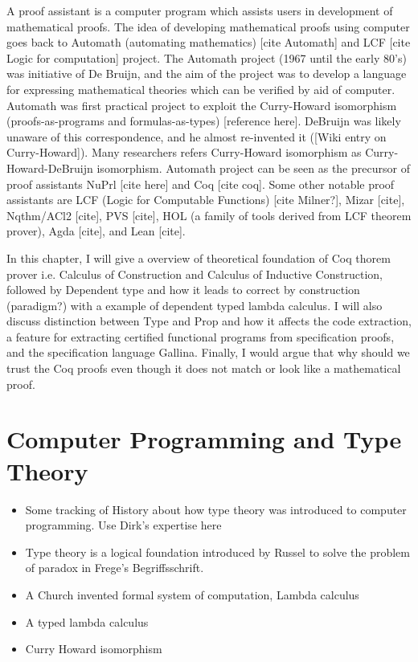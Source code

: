 
A proof assistant is a computer program which assists users in development of mathematical proofs. The idea of 
developing mathematical proofs using computer goes back to Automath (automating mathematics)
[cite Automath] and LCF [cite Logic for computation] project. The 
Automath project (1967 until the early 80's)  was initiative of De Bruijn, and the aim of the project was to develop
a language for expressing mathematical theories which can be verified by aid of computer.  Automath was first 
practical project to exploit the Curry-Howard isomorphism (proofs-as-programs and formulas-as-types)
 [reference here]. DeBruijn  was likely unaware of this correspondence, and he almost re-invented it 
 ([Wiki entry on Curry-Howard]). Many researchers refers Curry-Howard isomorphism as 
 Curry-Howard-DeBruijn isomorphism. Automath project can be seen as the precursor of
 proof assistants NuPrl [cite here] and Coq [cite coq].   Some other notable  proof assistants are 
 LCF (Logic for Computable Functions)  [cite Milner?], Mizar [cite], Nqthm/ACl2 [cite], PVS [cite], 
 HOL (a family of tools derived from LCF theorem prover), Agda [cite], and Lean [cite].


In this chapter, I will give a overview of theoretical foundation of 
Coq thorem prover i.e. Calculus of Construction and  
Calculus of Inductive Construction, followed by Dependent type 
and how it leads to 
correct by construction (paradigm?) with a example of dependent 
typed lambda calculus. I will also discuss distinction between Type and Prop 
and how it affects the code extraction, a feature for extracting 
certified functional programs from specification proofs, and the 
specification language Gallina. Finally, I would 
argue that why should we trust the Coq proofs even though it does not 
match or look like a mathematical proof.



 
\section{Computer Programming and Type Theory}
	\begin{itemize}
	\item Some tracking of History about how type theory was introduced 
	     to computer programming. Use Dirk's expertise here
	\item Type theory is a logical foundation introduced by 
	      Russel to solve the problem of  paradox in Frege's 
	      Begriffsschrift.
	\item A Church invented formal system of computation, Lambda calculus
	\item A typed lambda calculus
	\item Curry Howard isomorphism
	\end{itemize}


